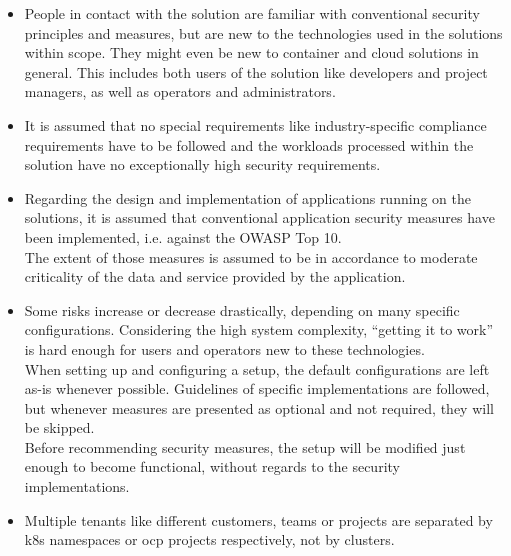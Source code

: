 \begin{itemize}

\item People in contact with the solution are familiar with conventional security principles and measures, but are new to the technologies used in the solutions within scope. They might even be new to container and cloud solutions in general. This includes both users of the solution like developers and project managers, as well as operators and administrators.

\item It is assumed that no special requirements like industry-specific compliance requirements have to be followed and the workloads processed within the solution have no exceptionally high security requirements. 

\item Regarding the design and implementation of applications running on the solutions, it is assumed that conventional application security measures have been implemented, i.e. against the OWASP Top 10.\footnotemark \\
	The extent of those measures is assumed to be in accordance to moderate criticality of the data and service provided by the application.


\item Some risks increase or decrease drastically, depending on many specific configurations. Considering the high system complexity, ``getting it to work'' is hard enough for users and operators new to these technologies.\footnotemark\\
	When setting up and configuring a setup, the default configurations are left as-is whenever possible. Guidelines of specific implementations are followed, but whenever measures are presented as optional and not required, they will be skipped. \\
	Before recommending security measures, the setup will be modified just enough to become functional, without regards to the security implementations.


\item Multiple tenants like different customers, teams or projects are separated by \gls{k8s} namespaces or \gls{ocp} projects respectively, not by clusters.

\end{itemize}


